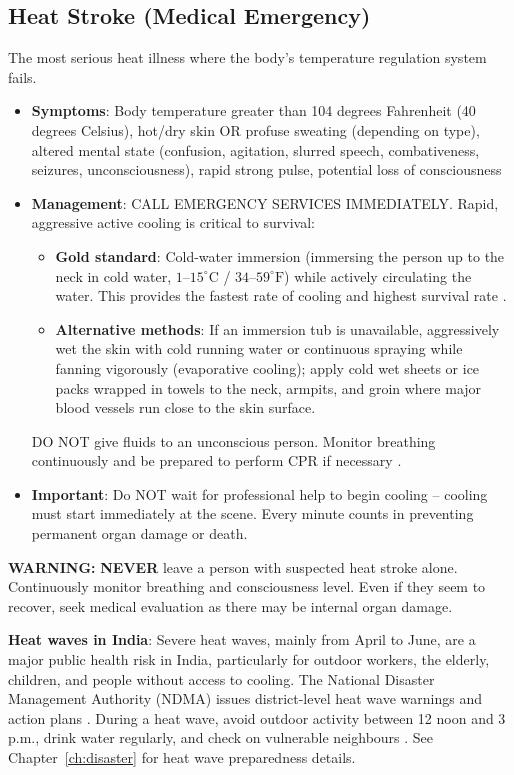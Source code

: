 \subsection{Heat Stroke (Medical Emergency)}

The most serious heat illness where the body's temperature regulation system fails.

\begin{itemize}[leftmargin=*]
  \item \textbf{Symptoms}: Body temperature greater than 104 degrees Fahrenheit (40 degrees Celsius), hot/dry skin OR profuse sweating (depending on type), altered mental state (confusion, agitation, slurred speech, combativeness, seizures, unconsciousness), rapid strong pulse, potential loss of consciousness
  \item \textbf{Management}: CALL EMERGENCY SERVICES IMMEDIATELY. Rapid, aggressive active cooling is critical to survival:
    \begin{itemize}
      \item \textbf{Gold standard}: Cold-water immersion (immersing the person up to the neck in cold water, $1\text{--}15^\circ\text{C}$ / $34\text{--}59^\circ\text{F}$) while actively circulating the water. This provides the fastest rate of cooling and highest survival rate \cite{aha_arc_2024}.
      \item \textbf{Alternative methods}: If an immersion tub is unavailable, aggressively wet the skin with cold running water or continuous spraying while fanning vigorously (evaporative cooling); apply cold wet sheets or ice packs wrapped in towels to the neck, armpits, and groin where major blood vessels run close to the skin surface.
    \end{itemize}
    DO NOT give fluids to an unconscious person. Monitor breathing continuously and be prepared to perform CPR if necessary \cite{aha_arc_2024,cdc_heat}.
  \item \textbf{Important}: Do NOT wait for professional help to begin cooling -- cooling must start immediately at the scene. Every minute counts in preventing permanent organ damage or death.
\end{itemize}

\textbf{WARNING:} \textbf{NEVER} leave a person with suspected heat stroke alone. Continuously monitor breathing and consciousness level. Even if they seem to recover, seek medical evaluation as there may be internal organ damage.

\noindent\textbf{Heat waves in India}: Severe heat waves, mainly from April to June, are a major public health risk in India, particularly for outdoor workers, the elderly, children, and people without access to cooling. The National Disaster Management Authority (NDMA) issues district-level heat wave warnings and action plans \cite{ndma}. During a heat wave, avoid outdoor activity between 12 noon and 3 p.m., drink water regularly, and check on vulnerable neighbours \cite{cdc_heat}. See Chapter~\ref{ch:disaster} for heat wave preparedness details.


